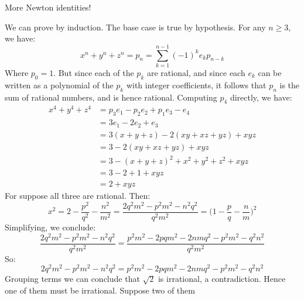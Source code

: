 \documentclass{article}                                                        %
\begin{document}
    \begin{problem}
        More Newton identities!
    \end{problem}
    \begin{solution}
        We can prove by induction. The base case is true by hypothesis.
        For any $n\geq{3}$, we have:
        \begin{equation}
            x^{n}+y^{n}+z^{n}=p_{n}
            =\sum_{k=1}^{n-1}(\minus{1})^{k}e_{k}p_{n-k}
        \end{equation}
        Where $p_{0}=1$. But since each of the $p_{k}$ are rational, and since
        each $e_{k}$ can be written as a polynomial of the $p_{k}$ with
        integer coefficients, it follows that $p_{n}$ is the sum of rational
        numbers, and is hence rational. Computing $p_{4}$ directly, we have:
        \begin{align}
            x^{4}+y^{4}+z^{4}
            &=p_{3}e_{1}-p_{2}e_{2}+p_{1}e_{3}-e_{4}\\
            &=3e_{1}-2e_{2}+e_{3}\\
            &=3(x+y+z)-2(xy+xz+yz)+xyz\\
            &=3-2(xy+xz+yz)+xyz\\
            &=3-(x+y+z)^{2}+x^{2}+y^{2}+z^{2}+xyz\\
            &=3-2+1+xyz\\
            &=2+xyz
        \end{align}
        For suppose all three are rational. Then:
        \begin{equation}
            x^{2}=2-\frac{p^{2}}{q^{2}}-\frac{n^{2}}{m^{2}}
                =\frac{2q^{2}m^{2}-p^{2}m^{2}-n^{2}q^{2}}{q^{2}m^{2}}
                =\Big(1-\frac{p}{q}-\frac{n}{m}\Big)^{2}
        \end{equation}
        Simplifying, we conclude:
        \begin{equation}
            \frac{2q^{2}m^{2}-p^{2}m^{2}-n^{2}q^{2}}{q^{2}m^{2}}
            =\frac{p^{2}m^{2}-2pqm^{2}-2nmq^{2}-p^{2}m^{2}-q^{2}n^{2}}
                  {q^{2}m^{2}}
        \end{equation}
        So:
        \begin{equation}
            2q^{2}m^{2}-p^{2}m^{2}-n^{2}q^{2}
                =p^{2}m^{2}-2pqm^{2}-2nmq^{2}-p^{2}m^{2}-q^{2}n^{2}
        \end{equation}
        Grouping terms we can conclude that $\sqrt{2}$ is irrational, a
        contradiction. Hence one of them must be irrational. Suppose two of them

\end{solution}
\end{document}
